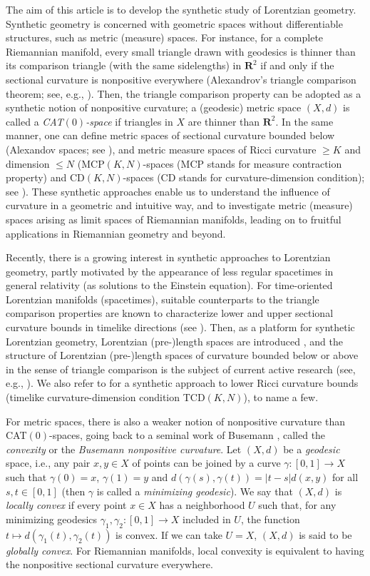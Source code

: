 \documentclass[a4paper,11pt]{article}
\numberwithin{equation}{section}
\theoremstyle{definition}
\theoremstyle{plain}
\newcommand{\R}{\mathbf R}
\newcommand{\lra}{\longrightarrow}
\begin{document}
The aim of this article is to develop the synthetic study of Lorentzian geometry.
Synthetic geometry is concerned with geometric spaces without differentiable structures,
such as metric (measure) spaces.
For instance, for a complete Riemannian manifold,
every small triangle drawn with geodesics is thinner than its comparison triangle (with the same sidelengths) in $\R^2$
if and only if the sectional curvature is nonpositive everywhere
(Alexandrov's triangle comparison theorem; see, e.g., \cite[Theorem~II.1A.6]{BH}).
Then, the triangle comparison property can be adopted as a synthetic notion of nonpositive curvature;
a (geodesic) metric space $(X,d)$ is called a \emph{CAT$(0)$-space} if triangles in $X$ are thinner than $\R^2$.
In the same manner, one can define metric spaces of sectional curvature bounded below
(Alexandov spaces; see \cite{BBI, AKP}),
and metric measure spaces of Ricci curvature $\ge K$ and dimension $\le N$
(MCP$(K,N)$-spaces (MCP stands for measure contraction property) and CD$(K,N)$-spaces (CD stands for curvature-dimension condition); see \cite{StI,StII,Omcp,LV}).
These synthetic approaches enable us to understand the influence of curvature in a geometric and intuitive way,
and to investigate metric (measure) spaces arising as limit spaces of Riemannian manifolds,
leading on to fruitful applications in Riemannian geometry and beyond.

Recently, there is a growing interest in synthetic approaches to Lorentzian geometry,
partly motivated by the appearance of less regular spacetimes in general relativity
(as solutions to the Einstein equation).
For time-oriented Lorentzian manifolds (spacetimes),
suitable counterparts to the triangle comparison properties are known to characterize
lower and upper sectional curvature bounds in timelike directions (see \cite{Har82,AB,BKOR}).
Then, as a platform for synthetic Lorentzian geometry,
Lorentzian (pre-)length spaces are introduced \cite{KS},
and the structure of Lorentzian (pre-)length spaces of curvature bounded below or above
in the sense of triangle comparison is the subject of current active research
(see, e.g., \cite{BORS,BS}).
We also refer to \cite{Mc,MS,CM} for a synthetic approach to lower Ricci curvature bounds (timelike curvature-dimension condition TCD$(K,N)$),
to name a few.

For metric spaces, there is also a weaker notion of nonpositive curvature than CAT$(0)$-spaces,
going back to a seminal work of Busemann \cite{Bu},
called the \emph{convexity} or the \emph{Busemann nonpositive curvature}.
Let $(X,d)$ be a \emph{geodesic} space, i.e., any pair $x,y \in X$ of points can be joined by a curve $\gamma\colon [0,1] \lra X$ such that $\gamma(0)=x$, $\gamma(1)=y$ and $d(\gamma(s),\gamma(t))=|t-s|d(x,y)$ for all $s,t \in [0,1]$
(then $\gamma$ is called a \emph{minimizing geodesic}).
We say that $(X,d)$ is \emph{locally convex} if every point $x \in X$ has a neighborhood $U$ such that, for any minimizing geodesics $\gamma_1,\gamma_2\colon [0,1] \lra X$ included in $U$, the function $t \longmapsto d(\gamma_1(t),\gamma_2(t))$ is convex.
If we can take $U=X$, $(X,d)$ is said to be \emph{globally convex}.
For Riemannian manifolds, local convexity is equivalent to having the nonpositive sectional curvature everywhere.
\end{document}

